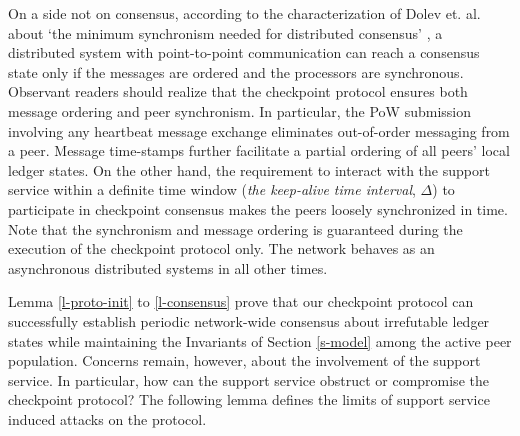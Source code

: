 On a side not on consensus, according to the characterization of Dolev et. al. about `the minimum synchronism needed for distributed consensus' \cite{Dolev:1987:MSN:7531.7533}, a distributed system with point-to-point communication can reach a consensus state only if the messages are ordered and the processors are synchronous. Observant readers should realize that the checkpoint protocol ensures both message ordering and peer synchronism. In particular, the PoW submission involving any heartbeat message exchange eliminates out-of-order messaging from a peer. Message time-stamps further facilitate a partial ordering of all peers' local ledger states. On the other hand, the requirement to interact with the support service within a definite time window (\textit{the keep-alive time interval}, $\Delta$) to participate in checkpoint consensus makes the peers loosely synchronized in time. Note that the synchronism and message ordering is guaranteed during the execution of the checkpoint protocol only. The network behaves as an asynchronous distributed systems in all other times.

Lemma \ref{l-proto-init} to \ref{l-consensus} prove that our checkpoint protocol can successfully establish periodic network-wide consensus about irrefutable ledger states while maintaining the Invariants of Section \ref{s-model} among the active peer population. Concerns remain, however, about the involvement of the support service. In particular, how can the support service obstruct or compromise the checkpoint protocol? The following lemma defines the limits of support service induced attacks on the protocol.

